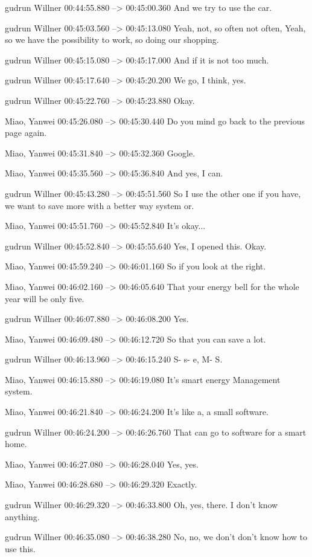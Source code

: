 {gudrun Willner 00:44:55.880 --> 00:45:00.360
And we try to use the car.

gudrun Willner 00:45:03.560 --> 00:45:13.080
Yeah, not, so often not often, Yeah, so we have the possibility to work, so doing our shopping.

gudrun Willner 00:45:15.080 --> 00:45:17.000
And if it is not too much.

gudrun Willner 00:45:17.640 --> 00:45:20.200
We go, I think, yes.

gudrun Willner 00:45:22.760 --> 00:45:23.880
Okay.

Miao, Yanwei 00:45:26.080 --> 00:45:30.440
Do you mind go back to the previous page again.

Miao, Yanwei 00:45:31.840 --> 00:45:32.360
Google.

Miao, Yanwei 00:45:35.560 --> 00:45:36.840
And yes, I can.

gudrun Willner 00:45:43.280 --> 00:45:51.560
So I use the other one if you have, we want to save more with a better way system or.

Miao, Yanwei 00:45:51.760 --> 00:45:52.840
It's okay...

gudrun Willner 00:45:52.840 --> 00:45:55.640
Yes, I opened this. Okay.

Miao, Yanwei 00:45:59.240 --> 00:46:01.160
So if you look at the right.

Miao, Yanwei 00:46:02.160 --> 00:46:05.640
That your energy bell for the whole year will be only five.

gudrun Willner 00:46:07.880 --> 00:46:08.200
Yes.

Miao, Yanwei 00:46:09.480 --> 00:46:12.720
So that you can save a lot.

gudrun Willner 00:46:13.960 --> 00:46:15.240
S- s- e, M- S.

Miao, Yanwei 00:46:15.880 --> 00:46:19.080
It's smart energy Management system.

Miao, Yanwei 00:46:21.840 --> 00:46:24.200
It's like a, a small software.

gudrun Willner 00:46:24.200 --> 00:46:26.760
That can go to software for a smart home.

Miao, Yanwei 00:46:27.080 --> 00:46:28.040
Yes, yes.

Miao, Yanwei 00:46:28.680 --> 00:46:29.320
Exactly.

gudrun Willner 00:46:29.320 --> 00:46:33.800
Oh, yes, there. I don't know anything.

gudrun Willner 00:46:35.080 --> 00:46:38.280
No, no, we don't don't know how to use this.

}
